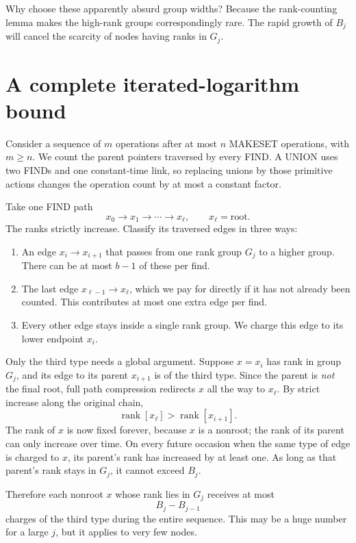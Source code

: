 Why choose these apparently absurd group widths? Because the rank-counting lemma makes the high-rank groups correspondingly rare. The rapid growth of \(B_j\) will cancel the scarcity of nodes having ranks in \(G_j\).

\section{A complete iterated-logarithm bound}

Consider a sequence of \(m\) operations after at most \(n\) MAKESET operations, with \(m\geq n\). We count the parent pointers traversed by every FIND. A UNION uses two FINDs and one constant-time link, so replacing unions by those primitive actions changes the operation count by at most a constant factor.

Take one FIND path
\[
 x_0\longrightarrow x_1\longrightarrow\cdots
 \longrightarrow x_\ell,
 \qquad x_\ell=\text{root}.
\]
The ranks strictly increase. Classify its traversed edges in three ways:

\begin{enumerate}
\item An edge \(x_i\to x_{i+1}\) that passes from one rank group \(G_j\) to a higher group. There can be at most \(b-1\) of these per find.
\item The last edge \(x_{\ell-1}\to x_\ell\), which we pay for directly if it has not already been counted. This contributes at most one extra edge per find.
\item Every other edge stays inside a single rank group. We charge this edge to its lower endpoint \(x_i\).
\end{enumerate}

Only the third type needs a global argument. Suppose \(x=x_i\) has rank in group \(G_j\), and its edge to its parent \(x_{i+1}\) is of the third type. Since the parent is \emph{not} the final root, full path compression redirects \(x\) all the way to \(x_\ell\). By strict increase along the original chain,
\[
 \operatorname{rank}[x_\ell]>
 \operatorname{rank}[x_{i+1}].
\]
The rank of \(x\) is now fixed forever, because \(x\) is a nonroot; the rank of its parent can only increase over time. On every future occasion when the same type of edge is charged to \(x\), its parent's rank has increased by at least one. As long as that parent's rank stays in \(G_j\), it cannot exceed \(B_j\).

Therefore each nonroot \(x\) whose rank lies in \(G_j\) receives at most
\[
 B_j-B_{j-1}
\]
charges of the third type during the entire sequence. This may be a huge number for a large \(j\), but it applies to very few nodes.

